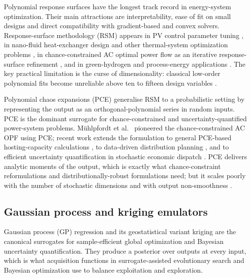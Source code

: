Polynomial response surfaces have the longest track record in
energy-system optimization. Their main attractions are interpretability,
ease of fit on small designs and direct compatibility with
gradient-based and convex solvers. Response-surface methodology
(RSM) appears in PV control parameter tuning
\cite{Hasanien2018168}, in nano-fluid heat-exchanger design and other
thermal-system optimization problems
\cite{Sami20181416,Ahmad202451,Sun2020}, in chance-constrained
AC optimal power flow as an iterative response-surface refinement
\cite{Xu20212696}, and in green-hydrogen and process-energy
applications \cite{Ahmad202451,Zulfiqar20211026}. The key practical
limitation is the curse of dimensionality: classical low-order
polynomial fits become unreliable above ten to fifteen design
variables \cite{Torun20192128,Meng20191219,Hasanien2018168}.

Polynomial chaos expansions (PCE) generalise RSM to a probabilistic
setting by representing the output as an orthogonal-polynomial series
in random inputs. PCE is the dominant surrogate for chance-constrained
and uncertainty-quantified power-system problems. M\"uhlpfordt et
al.~\cite{Muhlpfordt20194806} pioneered the chance-constrained AC OPF
using PCE; recent work extends the formulation to general PCE-based
hosting-capacity calculations \cite{Koirala20242284}, to data-driven
distribution planning \cite{Fu20202904,Fu2022}, and to efficient
uncertainty quantification in stochastic economic dispatch
\cite{Safta20172535}. PCE delivers analytic moments of the output,
which is exactly what chance-constraint reformulations and
distributionally-robust formulations need; but it scales poorly with
the number of stochastic dimensions and with output non-smoothness
\cite{Muhlpfordt20194806,Safta20172535,Koirala20242284,Xu20212696}.


\subsection{Gaussian process and kriging emulators}
\label{sec:tax:gp}

Gaussian process (GP) regression and its geostatistical variant
kriging are the canonical surrogates for sample-efficient global
optimization and Bayesian uncertainty quantification. They produce a
posterior over outputs at every input, which is what acquisition
functions in surrogate-assisted evolutionary search and Bayesian
optimization use to balance exploitation and exploration.

